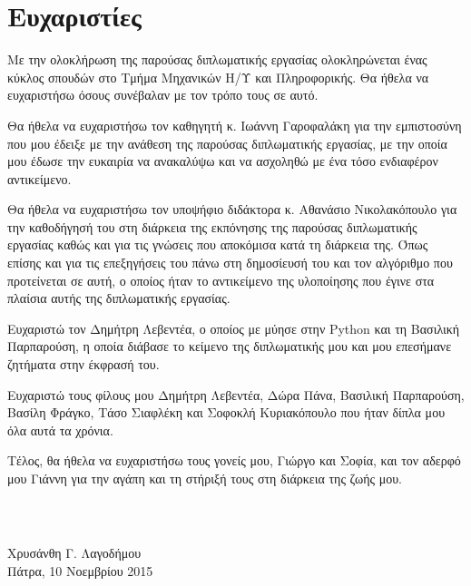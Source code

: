 \chapter*{Ευχαριστίες}

Με την ολοκλήρωση της παρούσας διπλωματικής εργασίας ολοκληρώνεται ένας κύκλος σπουδών στο Τμήμα Μηχανικών Η/Υ και Πληροφορικής. Θα ήθελα να ευχαριστήσω όσους συνέβαλαν με τον τρόπο τους σε αυτό.\par
Θα ήθελα να ευχαριστήσω τον καθηγητή κ. Ιωάννη Γαροφαλάκη για την εμπιστοσύνη που μου έδειξε με την ανάθεση της παρούσας διπλωματικής εργασίας, με την οποία μου έδωσε την ευκαιρία να ανακαλύψω και να ασχοληθώ με ένα τόσο ενδιαφέρον αντικείμενο. \par
Θα ήθελα να ευχαριστήσω τον υποψήφιο διδάκτορα κ. Αθανάσιο Νικολακόπουλο για την καθοδήγησή του στη διάρκεια της εκπόνησης της παρούσας διπλωματικής εργασίας καθώς και για τις γνώσεις που αποκόμισα κατά τη διάρκεια της. Όπως επίσης και για τις επεξηγήσεις του πάνω στη δημοσίευσή του και τον αλγόριθμο που προτείνεται σε αυτή, ο οποίος ήταν το αντικείμενο της υλοποίησης που έγινε στα πλαίσια αυτής της διπλωματικής εργασίας. \par
Ευχαριστώ τον Δημήτρη Λεβεντέα, ο οποίος με μύησε στην {\en Python} και τη Βασιλική Παρπαρούση, η οποία διάβασε το κείμενο της διπλωματικής μου και μου επεσήμανε ζητήματα στην έκφρασή του. \par
Ευχαριστώ τους φίλους μου Δημήτρη Λεβεντέα, Δώρα Πάνα, Βασιλική Παρπαρούση, Βασίλη Φράγκο, Τάσο Σιαφλέκη και Σοφοκλή Κυριακόπουλο που ήταν δίπλα μου όλα αυτά τα χρόνια. \par
Τέλος, θα ήθελα να ευχαριστήσω τους γονείς μου, Γιώργο και Σοφία, και τον αδερφό μου Γιάννη για την αγάπη και τη στήριξή τους στη διάρκεια της ζωής μου. 

\paragraph{~} \hfill Χρυσάνθη Γ. Λαγοδήμου \vspace{-10pt} \\

\hfill Πάτρα, 10 Νοεμβρίου 2015